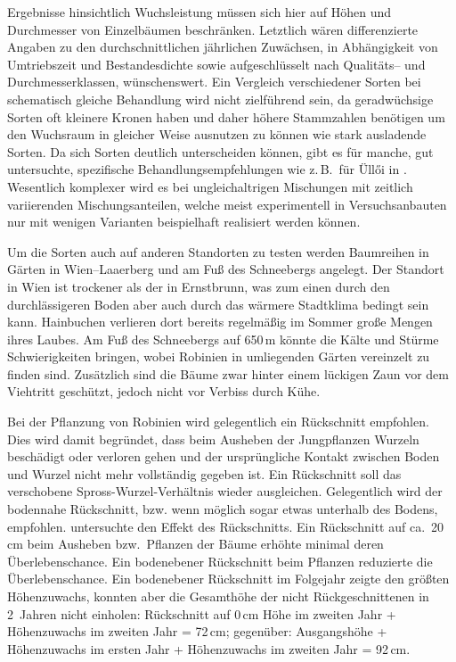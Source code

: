 \documentclass[twocolumn]{scrartcl}
\begin{document}
Ergebnisse hinsichtlich Wuchsleistung müssen sich hier auf Höhen und
Durchmesser von Einzelbäumen beschränken.
Letztlich wären differenzierte Angaben zu den durchschnittlichen jährlichen Zuwächsen,
in Abhängigkeit von Umtriebszeit und Bestandesdichte sowie aufgeschlüsselt nach Qualitäts-- und Durchmesserklassen, wünschenswert.
Ein
Vergleich verschiedener Sorten bei schematisch gleiche Behandlung wird
nicht zielführend sein, da geradwüchsige Sorten oft kleinere Kronen
haben \citep{bujtas1984robinie} und daher höhere Stammzahlen benötigen
um den Wuchsraum in gleicher Weise ausnutzen zu können wie stark
ausladende Sorten. Da sich Sorten deutlich unterscheiden können, gibt
es für manche, gut untersuchte, spezifische Behandlungsempfehlungen wie
z.\,B.\ für Üllői in \cite{redei2020ulloi}. Wesentlich komplexer wird
es bei ungleichaltrigen Mischungen mit zeitlich variierenden
Mischungsanteilen, welche meist experimentell in Versuchsanbauten
nur mit wenigen Varianten beispielhaft realisiert werden können.

Um die Sorten auch auf anderen Standorten zu testen werden Baumreihen
in Gärten in Wien--Laaerberg und am Fuß des Schneebergs angelegt. Der
Standort in Wien ist trockener als der in Ernstbrunn, was zum einen
durch den durchlässigeren Boden aber auch durch das wärmere Stadtklima
bedingt sein kann. Hainbuchen verlieren dort bereits regelmäßig im
Sommer große Mengen ihres Laubes. Am Fuß des Schneebergs auf 650\,m
könnte die Kälte und Stürme Schwierigkeiten bringen, wobei Robinien in
umliegenden Gärten vereinzelt zu finden sind. Zusätzlich sind die Bäume zwar hinter einem
lückigen Zaun vor dem Viehtritt geschützt, jedoch nicht vor
Verbiss durch Kühe.

Bei der Pflanzung von Robinien wird gelegentlich ein Rückschnitt
empfohlen.
Dies wird damit begründet, dass beim Ausheben der Jungpflanzen Wurzeln beschädigt oder verloren gehen
und der ursprüngliche Kontakt zwischen Boden und Wurzel nicht mehr vollständig gegeben ist.
Ein Rückschnitt soll das verschobene Spross-Wurzel-Verhältnis wieder ausgleichen.
Gelegentlich wird der
bodennahe Rückschnitt, bzw. wenn möglich sogar etwas unterhalb des
Bodens, empfohlen.
\cite{meginnis1940robinieRueckschnitt}
untersuchte den Effekt des Rückschnitts. Ein Rückschnitt auf
ca.\ 20\,cm beim Ausheben bzw.\ Pflanzen der Bäume erhöhte minimal
deren Überlebenschance. Ein bodenebener Rückschnitt beim Pflanzen
reduzierte die Überlebenschance. Ein bodenebener Rückschnitt im
Folgejahr zeigte den größten Höhenzuwachs, konnten aber die Gesamthöhe
der nicht Rückgeschnittenen in 2~Jahren nicht einholen:
Rückschnitt auf 0\,cm Höhe im zweiten Jahr + Höhenzuwachs im zweiten Jahr = 72\,cm;
gegenüber: Ausgangshöhe + Höhenzuwachs im ersten Jahr + Höhenzuwachs im zweiten Jahr = 92\,cm.
\end{document}
